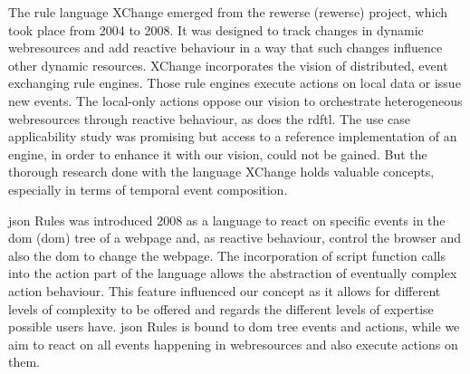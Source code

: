 The rule language \textrm{XChange}\cite{2005-Patranjan-TLE.pdf} emerged from the \textrm{\acrlong{rewerse} (\acrshort{rewerse})} project\cite{wwwRewerse}, which took place from 2004 to 2008. 
It was designed to track changes in dynamic \textrm{\glspl{webresource}} and add reactive behaviour in a way that such changes influence other dynamic resources.
\textrm{XChange} incorporates the vision of distributed, event exchanging rule engines.
Those rule engines execute actions on local data or issue new events.
The local-only actions oppose our vision to orchestrate heterogeneous \glspl{webresource} through reactive behaviour, as does the \textrm{\acrshort{rdftl}}.
The use case applicability study was promising but access to a reference implementation of an engine, in order to enhance it with our vision, could not be gained. %
But the thorough research done with the language \textrm{XChange} holds valuable concepts, especially in terms of temporal event composition.

\textrm{\acrshort{json} Rules}\cite{2008-Giurca_Pascalau-JSON_Rules.pdf} was introduced 2008 as a language to react on specific events in the \textrm{\acrlong{dom} (\acrshort{dom})} tree of a webpage and, as reactive behaviour, control the browser and also the \textrm{\acrshort{dom}} to change the webpage.
The incorporation of script function calls into the action part of the language allows the abstraction of eventually complex action behaviour.
This feature influenced our concept as it allows for different levels of complexity to be offered and regards the different levels of expertise possible users have.
\textrm{\acrshort{json} Rules} is bound to \textrm{\acrshort{dom}} tree events and actions, while we aim to react on all events happening in \textrm{\glspl{webresource}} and also execute actions on them.

